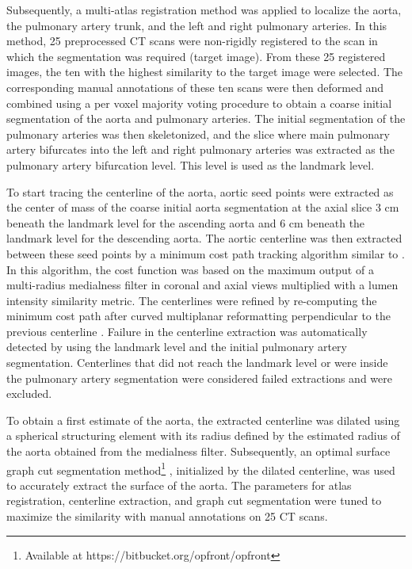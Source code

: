 Subsequently, a multi-atlas registration method was applied \autocite{kiricsli2010evaluation} to localize the aorta, the pulmonary artery trunk, and the left and right pulmonary arteries. In this method, 25 preprocessed CT scans were non-rigidly registered to the scan in which the
segmentation was required (target image). From these 25 registered images, the ten with the highest similarity to the target image were selected. The corresponding manual annotations of these ten scans were then deformed and combined using a per voxel majority voting procedure to obtain a coarse initial segmentation of the aorta and pulmonary arteries. The initial segmentation of the pulmonary arteries was then skeletonized, and the slice where main pulmonary artery bifurcates into the left and right pulmonary arteries was extracted as the pulmonary
artery bifurcation level. This level is used as the landmark level.


To start tracing the centerline of the aorta, aortic seed points were extracted as the center of mass of the coarse initial aorta segmentation at the axial slice 3 cm beneath the landmark level for the ascending aorta and 6 cm beneath the landmark level for the descending aorta. The aortic centerline was then extracted between these seed points by a minimum cost path tracking algorithm similar to \autocite{sedghi2018aorta}. In this algorithm, the cost function was based on the maximum output of a multi-radius medialness filter in coronal and axial views multiplied with a lumen intensity similarity metric. The centerlines were refined by re-computing the minimum cost path after curved multiplanar reformatting perpendicular to the previous centerline \autocite{tang2012semiautomatic}. Failure in the centerline extraction was automatically detected by using the landmark level and the initial pulmonary artery segmentation. Centerlines that did not reach the landmark level or were inside the pulmonary artery segmentation were considered failed extractions and were excluded.


To obtain a first estimate of the aorta, the extracted centerline was dilated using a spherical structuring element with its radius defined by the estimated radius of the aorta obtained from the medialness filter. Subsequently, an optimal surface graph cut segmentation method\footnote{Available at https://bitbucket.org/opfront/opfront} \autocite{petersen2014optimal}, initialized by the dilated centerline, was used to accurately extract the surface of the aorta. The parameters for atlas registration, centerline extraction, and graph cut segmentation were tuned to maximize the similarity with manual annotations on 25 CT scans.

